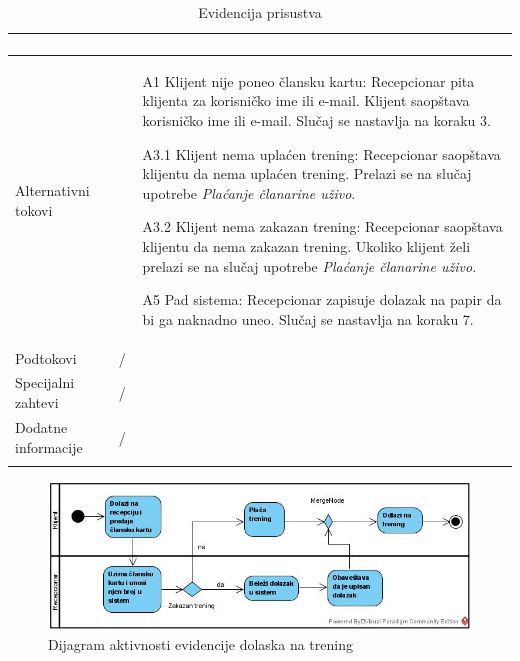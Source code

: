 \documentclass[../main.tex]{subfiles}
\begin{document}
\begin{longtable}{| p{} | p{} |}
\begin{enumerate}
    \end{enumerate}\\
\hline
    Alternativni tokovi & \begin{itemize}
        \item[A1] Klijent nije poneo člansku kartu: Recepcionar pita klijenta za korisničko ime ili e-mail. Klijent saopštava korisničko ime ili e-mail. Slučaj se nastavlja na koraku 3.
        \item[A3.1] Klijent nema uplaćen trening: Recepcionar saopštava klijentu da nema uplaćen trening. Prelazi se na slučaj upotrebe \textit{Plaćanje članarine uživo}.
        \item[A3.2] Klijent nema zakazan trening: Recepcionar saopštava klijentu da nema zakazan trening. Ukoliko klijent želi prelazi se na slučaj upotrebe \textit{Plaćanje članarine uživo.} 
        \item[A5] Pad sistema: Recepcionar zapisuje dolazak na papir da bi ga naknadno uneo. Slučaj se nastavlja na koraku 7.
    \end{itemize}\\
\hline
    Podtokovi & /\\
\hline
    Specijalni zahtevi & /\\
\hline
    Dodatne informacije & /\\
\hline
\caption{Evidencija prisustva} %
\end{longtable}
 
\begin{figure}[!ht]
\begin{center}
\includegraphics[scale=0.55]{sections/images/dijagram_aktivnosti_evidencije_prisustva.jpg}
\end{center}
\caption{Dijagram aktivnosti evidencije dolaska na trening}
\label{fig:kontekst}
\end{figure}
\end{document}
